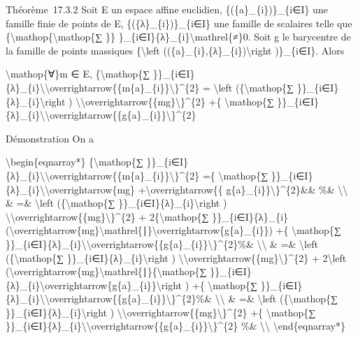 \documentclass[]{article}
\begin{document}
Théorème~17.3.2 Soit E un espace affine euclidien,
\{(\{a\}\_\{i\})\}\_\{i∈I\} une famille finie de points de E,
\{(\{λ\}\_\{i\})\}\_\{i∈I\} une famille de scalaires telle que
\{\textbackslash{}mathop\{\textbackslash{}mathop\{∑ \}\}
\}\_\{i∈I\}\{λ\}\_\{i\}\textbackslash{}mathrel\{≠\}0. Soit g le
barycentre de la famille de points massiques \{\textbackslash{}left
((\{a\}\_\{i\},\{λ\}\_\{i\})\textbackslash{}right )\}\_\{i∈I\}. Alors

\textbackslash{}mathop\{∀\}m ∈ E, \{\textbackslash{}mathop\{∑
\}\}\_\{i∈I\}\{λ\}\_\{i\}\textbackslash{}\textbar{}\textbackslash{}overrightarrow\{\{m\{a\}\_\{i\}\}\textbackslash{}\textbar{}\}\^{}\{2\}
= \textbackslash{}left (\{\textbackslash{}mathop\{∑
\}\}\_\{i∈I\}\{λ\}\_\{i\}\textbackslash{}right )
\textbackslash{}\textbar{}\textbackslash{}overrightarrow\{\{mg\}\textbackslash{}\textbar{}\}\^{}\{2\}
+\{ \textbackslash{}mathop\{∑
\}\}\_\{i∈I\}\{λ\}\_\{i\}\textbackslash{}\textbar{}\textbackslash{}overrightarrow\{\{g\{a\}\_\{i\}\}\textbackslash{}\textbar{}\}\^{}\{2\}

Démonstration On a

\textbackslash{}begin\{eqnarray*\} \{\textbackslash{}mathop\{∑
\}\}\_\{i∈I\}\{λ\}\_\{i\}\textbackslash{}\textbar{}\textbackslash{}overrightarrow\{\{m\{a\}\_\{i\}\}\textbackslash{}\textbar{}\}\^{}\{2\}
=\{ \textbackslash{}mathop\{∑
\}\}\_\{i∈I\}\{λ\}\_\{i\}\textbackslash{}\textbar{}\textbackslash{}overrightarrow\{mg\}
+\textbackslash{}overrightarrow\{\{
g\{a\}\_\{i\}\}\textbackslash{}\textbar{}\}\^{}\{2\}\&\& \%\&
\textbackslash{}\textbackslash{} \& =\& \textbackslash{}left
(\{\textbackslash{}mathop\{∑
\}\}\_\{i∈I\}\{λ\}\_\{i\}\textbackslash{}right )
\textbackslash{}\textbar{}\textbackslash{}overrightarrow\{\{mg\}\textbackslash{}\textbar{}\}\^{}\{2\}
+ 2\{\textbackslash{}mathop\{∑
\}\}\_\{i∈I\}\{λ\}\_\{i\}(\textbackslash{}overrightarrow\{mg\}\textbackslash{}mathrel\{∣\}\textbackslash{}overrightarrow\{g\{a\}\_\{i\}\})
+\{ \textbackslash{}mathop\{∑
\}\}\_\{i∈I\}\{λ\}\_\{i\}\textbackslash{}\textbar{}\textbackslash{}overrightarrow\{\{g\{a\}\_\{i\}\}\textbackslash{}\textbar{}\}\^{}\{2\}\%\&
\textbackslash{}\textbackslash{} \& =\& \textbackslash{}left
(\{\textbackslash{}mathop\{∑
\}\}\_\{i∈I\}\{λ\}\_\{i\}\textbackslash{}right )
\textbackslash{}\textbar{}\textbackslash{}overrightarrow\{\{mg\}\textbackslash{}\textbar{}\}\^{}\{2\}
+ 2\textbackslash{}left
(\textbackslash{}overrightarrow\{mg\}\textbackslash{}mathrel\{∣\}\{\textbackslash{}mathop\{∑
\}\}\_\{i∈I\}\{λ\}\_\{i\}\textbackslash{}overrightarrow\{g\{a\}\_\{i\}\}\textbackslash{}right
) +\{ \textbackslash{}mathop\{∑
\}\}\_\{i∈I\}\{λ\}\_\{i\}\textbackslash{}\textbar{}\textbackslash{}overrightarrow\{\{g\{a\}\_\{i\}\}\textbackslash{}\textbar{}\}\^{}\{2\}\%\&
\textbackslash{}\textbackslash{} \& =\& \textbackslash{}left
(\{\textbackslash{}mathop\{∑
\}\}\_\{i∈I\}\{λ\}\_\{i\}\textbackslash{}right )
\textbackslash{}\textbar{}\textbackslash{}overrightarrow\{\{mg\}\textbackslash{}\textbar{}\}\^{}\{2\}
+\{ \textbackslash{}mathop\{∑
\}\}\_\{i∈I\}\{λ\}\_\{i\}\textbackslash{}\textbar{}\textbackslash{}overrightarrow\{\{g\{a\}\_\{i\}\}\textbackslash{}\textbar{}\}\^{}\{2\}
\%\& \textbackslash{}\textbackslash{} \textbackslash{}end\{eqnarray*\}
\end{document}
